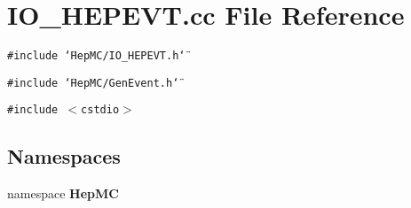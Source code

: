 \section{IO\_\-HEPEVT.cc File Reference}
\label{IO__HEPEVT_8cc}
{\tt \#include \char`\"{}Hep\-MC/IO\_\-HEPEVT.h\char`\"{}}\par
{\tt \#include \char`\"{}Hep\-MC/Gen\-Event.h\char`\"{}}\par
{\tt \#include $<$cstdio$>$}\par
\subsection*{Namespaces}
\begin{CompactItemize}
\item 
namespace {\bf Hep\-MC}
\end{CompactItemize}
